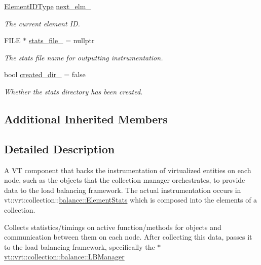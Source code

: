 \begin{DoxyCompactItemize}
\hyperlink{namespacevt_1_1vrt_1_1collection_1_1balance_a14c8d2c972f2913aa3f1636e5be0a120}{Element\+I\+D\+Type} \hyperlink{structvt_1_1vrt_1_1collection_1_1balance_1_1_node_stats_a7b1b992f34d07739e854c95ef921f0ab}{next\+\_\+elm\+\_\+}
\begin{DoxyCompactList}\small\item\em The current element ID. \end{DoxyCompactList}\item 
F\+I\+LE $\ast$ \hyperlink{structvt_1_1vrt_1_1collection_1_1balance_1_1_node_stats_a8f2c59c675643634d8e4d2d5ba89ecbd}{stats\+\_\+file\+\_\+} = nullptr
\begin{DoxyCompactList}\small\item\em The stats file name for outputting instrumentation. \end{DoxyCompactList}\item 
bool \hyperlink{structvt_1_1vrt_1_1collection_1_1balance_1_1_node_stats_a41cafe7ec8557587a5e922c2289de342}{created\+\_\+dir\+\_\+} = false
\begin{DoxyCompactList}\small\item\em Whether the stats directory has been created. \end{DoxyCompactList}\end{DoxyCompactItemize}
\subsection*{Additional Inherited Members}


\subsection{Detailed Description}
A VT component that backs the instrumentation of virtualized entities on each node, such as the objects that the collection manager orchestrates, to provide data to the load balancing framework. The actual instrumentation occurs in {\ttfamily vt\+::vrt\+:collection\+:}\+:\hyperlink{structvt_1_1vrt_1_1collection_1_1balance_1_1_element_stats}{balance\+::\+Element\+Stats} which is composed into the elements of a collection. 

Collects statistics/timings on active function/methods for objects and communication between them on each node. After collecting this data, passes it to the load balancing framework, specifically the {\ttfamily $\ast$} \hyperlink{structvt_1_1vrt_1_1collection_1_1balance_1_1_l_b_manager}{vt\+::vrt\+::collection\+::balance\+::\+L\+B\+Manager} 

